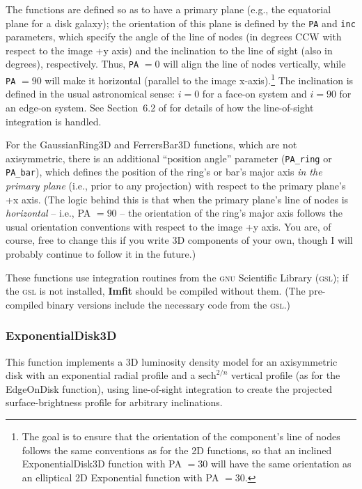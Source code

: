\documentclass[10pt,a4paper,article]{memoir}
\newcommand{\imfit}{\textbf{Imfit}}
\begin{document}
The functions are defined so as to have a primary plane (e.g., the
equatorial plane for a disk galaxy); the orientation of this plane is
defined by the \texttt{PA} and \texttt{inc} parameters, which specify
the angle of the line of nodes (in degrees CCW with respect to the image
+y axis) and the inclination to the line of sight (also in degrees),
respectively. Thus, \texttt{PA} $= 0$ will align the line of nodes
vertically, while \texttt{PA} $= 90$ will make it horizontal (parallel
to the image x-axis).\footnote{The goal is to ensure that the
orientation of the component's line of nodes follows the same
conventions as for the 2D functions, so that an inclined
ExponentialDisk3D function with PA $= 30$ will have the same orientation
as an elliptical 2D Exponential function with PA $= 30$.} The
inclination is defined in the usual astronomical sense: $i = 0$ for a
face-on system and $i = 90$ for an edge-on system. See Section~6.2 of
\citet{erwin15} for details of how the line-of-sight integration is
handled.

For the GaussianRing3D and FerrersBar3D functions, which are not
axisymmetric, there is an additional ``position angle'' parameter
(\texttt{PA\_ring} or \texttt{PA\_bar}), which defines the position of
the ring's or bar's major axis \textit{in the primary plane} (i.e., prior to any
projection) with respect to the primary plane's +x axis. (The logic
behind this is that when the primary plane's line of nodes is
\textit{horizontal} -- i.e., PA $= 90$ -- the orientation of the
ring's major axis follows the usual orientation conventions with respect
to the image +y axis. You are, of course, free to change this if you
write 3D components of your own, though I will probably continue to
follow it in the future.)

These functions use integration routines from the \textsc{gnu}
Scientific Library (\textsc{gsl}); if the \textsc{gsl} is not installed,
\imfit{} should be compiled without them. (The pre-compiled binary
versions include the necessary code from the \textsc{gsl}.)


\subsubsection{ExponentialDisk3D}

This function implements a 3D luminosity density model for an
axisymmetric disk with an exponential radial profile and a
${\mathrm{sech}}^{2/n}$ vertical profile (as for the EdgeOnDisk
function), using line-of-sight integration to create the projected
surface-brightness profile for arbitrary inclinations.
\end{document}
